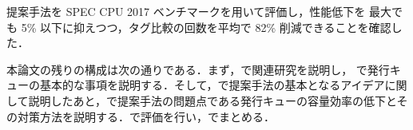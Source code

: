 提案手法を SPEC CPU 2017 ベンチマークを用いて評価し，性能低下を 最大でも 5\% 以下に抑えつつ，タグ比較の回数を平均で 82\% 削減できることを確認した．

本論文の残りの構成は次の通りである．まず，で関連研究を説明し， で発行キューの基本的な事項を説明する．そして，で提案手法の基本となるアイデアに関して説明したあと，で提案手法の問題点である発行キューの容量効率の低下とその対策方法を説明する．で評価を行い，でまとめる．

